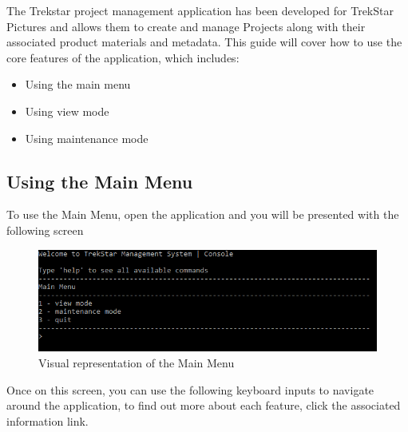 \documentclass[
  english,
  a4paper,
,tablecaptionabove
]{scrartcl}
\providecommand{\tightlist}{%
  \setlength{\itemsep}{0pt}\setlength{\parskip}{0pt}}
\begin{document}
The Trekstar project management application has been developed for
TrekStar Pictures and allows them to create and manage Projects along
with their associated product materials and metadata. This guide will
cover how to use the core features of the application, which includes:

\begin{itemize}
\tightlist
\item
  Using the main menu
\item
  Using view mode
\item
  Using maintenance mode
\end{itemize}

\hypertarget{using-the-main-menu}{%
\subsection{Using the Main Menu}\label{using-the-main-menu}}

To use the Main Menu, open the application and you will be presented
with the following screen

\begin{figure}
\centering
\includegraphics{images/user-guide/main-menu/using-the-main-menu.png}
\caption{Visual representation of the Main Menu}
\end{figure}

Once on this screen, you can use the following keyboard inputs to
navigate around the application, to find out more about each feature,
click the associated information link.
\end{document}
